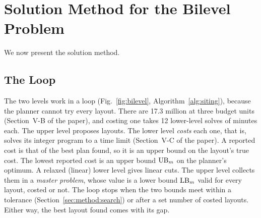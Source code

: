 \section{Solution Method for the Bilevel Problem}\label{sec:method}
We now present the solution method.

\subsection{The Loop}\label{sec:method:overview}
The two levels work in a loop (Fig.~\ref{fig:bilevel}, Algorithm~\ref{alg:siting}), because the planner cannot try every layout. There are 17.3 million at three budget units (Section~V-B of the paper), and costing one takes 12 lower-level solves of minutes each. The upper level proposes layouts. The lower level \emph{costs} each one, that is, solves its integer program to a time limit (Section~V-C of the paper). A reported cost is that of the best plan found, so it is an upper bound on the layout's true cost. The lowest reported cost is an upper bound $\mathrm{UB}_m$ on the planner's optimum. A relaxed (linear) lower level gives linear cuts. The upper level collects them in a \emph{master problem}, whose value is a lower bound $\mathrm{LB}_m$ valid for every layout, costed or not. The loop stops when the two bounds meet within a tolerance (Section~\ref{sec:method:search}) or after a set number of costed layouts. Either way, the best layout found comes with its gap.

